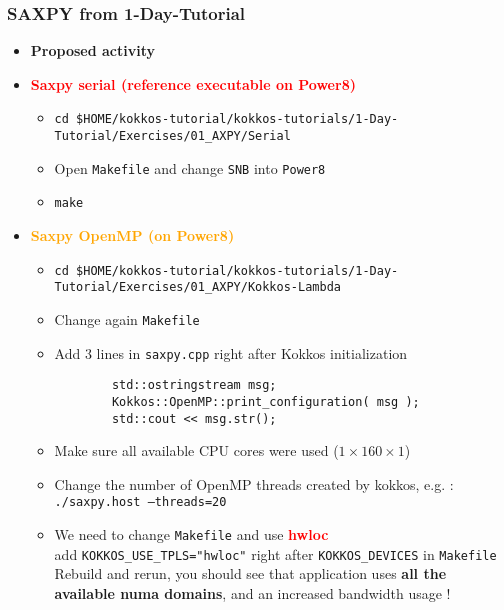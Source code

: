 \begin{frame}[fragile=singleslide]
  \frametitle{SAXPY from 1-Day-Tutorial}

  \begin{itemize}
  \item \textbf{Proposed activity}
  \item \textcolor{red}{\textbf{Saxpy serial (reference executable on Power8)}}
    \begin{itemize}
    \item \texttt{cd \$HOME/kokkos-tutorial/kokkos-tutorials/1-Day-Tutorial/Exercises/01\_AXPY/Serial}
    \item Open \texttt{Makefile} and change \texttt{SNB} into \texttt{Power8}
    \item \texttt{make}
    \end{itemize}
  \item \textcolor{orange}{\textbf{Saxpy OpenMP (on Power8)}}
    \begin{itemize}
    \item \texttt{cd \$HOME/kokkos-tutorial/kokkos-tutorials/1-Day-Tutorial/Exercises/01\_AXPY/Kokkos-Lambda}
    \item Change again \texttt{Makefile}
    \item Add 3 lines in \texttt{saxpy.cpp} right after Kokkos initialization
      \begin{verbatim}
        std::ostringstream msg;
        Kokkos::OpenMP::print_configuration( msg );
        std::cout << msg.str();
      \end{verbatim}
    \item Make sure all available CPU cores were used ($1\times 160 \times 1$)
    \item Change the number of OpenMP threads created by kokkos, e.g. :\\
      \texttt{./saxpy.host  --threads=20}
    \item We need to change \texttt{Makefile} and use \textcolor{red}{\textbf{hwloc}}\\
      add \texttt{KOKKOS\_USE\_TPLS="hwloc"} right after \texttt{KOKKOS\_DEVICES} in \texttt{Makefile}\\
      Rebuild and rerun, you should see that application uses \textbf{all the available numa domains}, and an increased bandwidth usage !
    \end{itemize}
  \end{itemize}

\end{frame}

